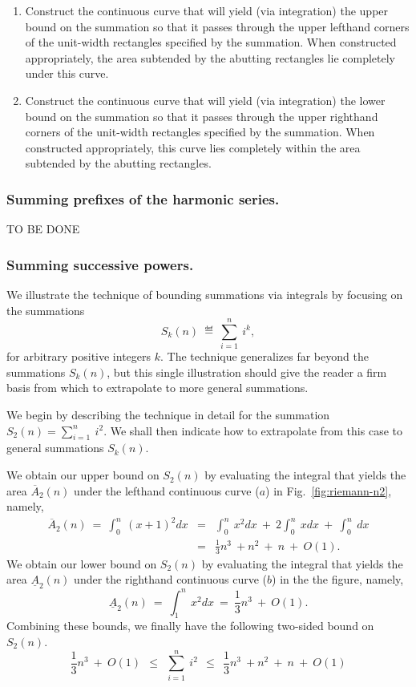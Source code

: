 \documentclass{article}
\begin{document}
\begin{itemize}
\begin{enumerate}
\item
Construct the continuous curve that will yield (via integration) the
upper bound on the summation so that it passes through the upper
lefthand corners of the unit-width rectangles specified by the
summation.  When constructed appropriately, the area subtended by the
abutting rectangles lie completely under this curve.

\item
Construct the continuous curve that will yield (via integration) the
lower bound on the summation so that it passes through the upper
righthand corners of the unit-width rectangles specified by the
summation.  When constructed appropriately, this curve lies completely
within the area subtended by the abutting rectangles.
\end{enumerate}

\subsubsection{Summing prefixes of the harmonic series.}
TO BE DONE



\subsubsection{Summing successive powers.}
We illustrate the technique of bounding summations via integrals by
focusing on the summations
\[ S_k(n) \ \eqdef \ \sum_{i=1}^n \ i^k, \]
for arbitrary positive integers $k$.  The technique generalizes far
beyond the summations $S_k(n)$, but this single illustration should
give the reader a firm basis from which to extrapolate to more general
summations.

We begin by describing the technique in detail for the summation
$\displaystyle S_2(n) = \sum_{i=1}^n \ i^2$.  We shall then indicate
how to extrapolate from this case to general summations $S_k(n)$.

We obtain our upper bound on $S_2(n)$ by evaluating the integral that
yields the area $\overline{A}_2(n)$ under the lefthand continuous
curve ($a$) in Fig.~\ref{fig:riemann-n2}, namely,
\begin{eqnarray}
\label{eq:upper-integral-x2}
\overline{A}_2(n) \ = \
\int_0^n \ (x+1)^2 dx & = &
  \int_0^n \ x^2 dx \ + \ 2 \int_0^n \ x dx \ + \ \int_0^n \ dx \\
\nonumber
 & = & \frac{1}{3} n^3 \ + n^2 \ + \ n \ + \ O(1).
\end{eqnarray}
We obtain our lower bound on $S_2(n)$ by evaluating the integral that
yields the area $\underline{A}_2(n)$ under the righthand continuous
curve ($b$) in the the figure, namely,
\begin{equation}
\label{eq:lower-integral-x2}
\underline{A}_2(n) \ = \
\int_1^n \ x^2 dx \ = \ \frac{1}{3} n^3 \ + \ O(1).
\end{equation}
Combining these bounds, we finally have the following two-sided bound
on $S_2(n)$.
\begin{equation}
\label{eq:bounds-sum-x2}
\frac{1}{3} n^3 \ + \ O(1)
  \ \ \leq \ \ \sum_{i=1}^n \ i^2
  \ \ \leq \ \ \frac{1}{3} n^3 \ + n^2 \ + \ n \ + \ O(1)
\end{equation}


\end{itemize}
\end{document}
